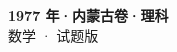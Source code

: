 \documentclass[zihao=-4, a4paper]{ctexart}
\begin{document}
\begin{center}
  {\Large\bfseries 1977 年·内蒙古卷·理科}\\[4pt]
  {\large 数学 · 试题版}
\end{center}
\medskip
{}

\end{document}

